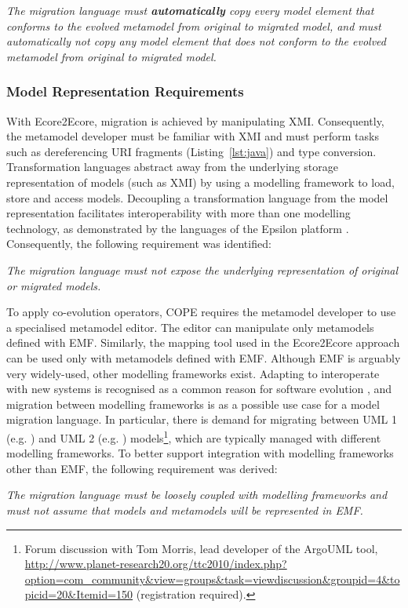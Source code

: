 \emph{The migration language must \textbf{automatically} copy every model element that conforms to the evolved metamodel from original to migrated model, and must automatically not copy any model element that does not conform to the evolved metamodel from original to migrated model.}


\subsubsection{Model Representation Requirements}
With Ecore2Ecore, migration is achieved by manipulating XMI. Consequently, the metamodel developer must be familiar with XMI and must perform tasks such as dereferencing URI fragments (Listing~\ref{lst:java}) and type conversion. Transformation languages abstract away from the underlying storage representation of models (such as XMI) by using a modelling framework to load, store and access models. Decoupling a transformation language from the model representation facilitates interoperability with more than one modelling technology, as demonstrated by the languages of the Epsilon platform \cite{kolovos09thesis}. Consequently, the following requirement was identified:

\emph{The migration language must not expose the underlying representation of original or migrated models.}

\vspace{5mm}

To apply co-evolution operators, COPE requires the metamodel developer to use a specialised metamodel editor. The editor can manipulate only metamodels defined with EMF. Similarly, the mapping tool used in the Ecore2Ecore approach can be used only with metamodels defined with EMF. Although EMF is arguably very widely-used, other modelling frameworks exist. Adapting to interoperate with new systems is recognised as a common reason for software evolution \cite{sjoberg93quantifying}, and migration between modelling frameworks is as a possible use case for a model migration language. In particular, there is demand for migrating between UML 1 (e.g. \cite{uml14}) and UML 2 (e.g. \cite{uml22}) models\footnote{Forum discussion with Tom Morris, lead developer of the ArgoUML tool, \url{http://www.planet-research20.org/ttc2010/index.php?option=com_community&view=groups&task=viewdiscussion&groupid=4&topicid=20&Itemid=150} (registration required).}, which are typically managed with different modelling frameworks. To better support integration with modelling frameworks other than EMF, the following requirement was derived:

\emph{The migration language must be loosely coupled with modelling frameworks and must not assume that models and metamodels will be represented in EMF.}